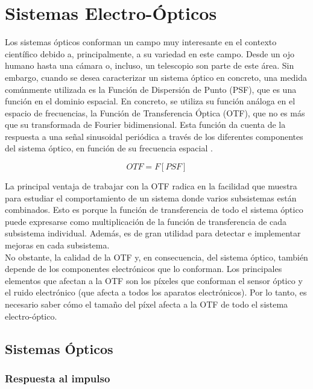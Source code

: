 \documentclass[12pt]{article}
\numberwithin{equation}{section}%
\begin{document}
\section{Sistemas Electro-Ópticos}
\label{sec: Sistemas Electro-Ópticos}
Los sistemas ópticos conforman un campo muy interesante en el contexto científico debido a, principalmente, a su variedad en este campo. Desde un ojo humano hasta una cámara o, incluso, un telescopio son parte de este área. Sin embargo, cuando se desea caracterizar un sistema óptico en concreto, una medida comúnmente utilizada es la Función de Dispersión de Punto (PSF), que es una función en el dominio espacial. En concreto, se utiliza su función análoga en el espacio de frecuencias, la Función de Transferencia Óptica (OTF), que no es más que su transformada de Fourier bidimensional. Esta función da cuenta de la respuesta a una señal sinusoidal periódica a través de los diferentes componentes del sistema óptico, en función de su frecuencia espacial \cite{williamsOTF}. 

\begin{equation}
    OTF = F[PSF]
\end{equation}

La principal ventaja de trabajar con la OTF radica en la facilidad que muestra para estudiar el comportamiento de un sistema donde varios subsistemas están combinados. Esto es porque la función de transferencia de todo el sistema óptico puede expresarse como multiplicación de la función de transferencia de cada subsistema individual. Además, es de gran utilidad para detectar e implementar mejoras en cada subsistema.\\

No obstante, la calidad de la OTF y, en consecuencia, del sistema óptico, también depende de los componentes electrónicos que lo conforman. Los principales elementos que afectan a la OTF son los píxeles que conforman el sensor óptico y el ruido electrónico (que afecta a todos los aparatos electrónicos). Por lo tanto, es necesario saber cómo el tamaño del píxel afecta a la OTF de todo el sistema electro-óptico.\\

\subsection{Sistemas Ópticos}

\subsubsection{Respuesta al impulso}
\end{document}
